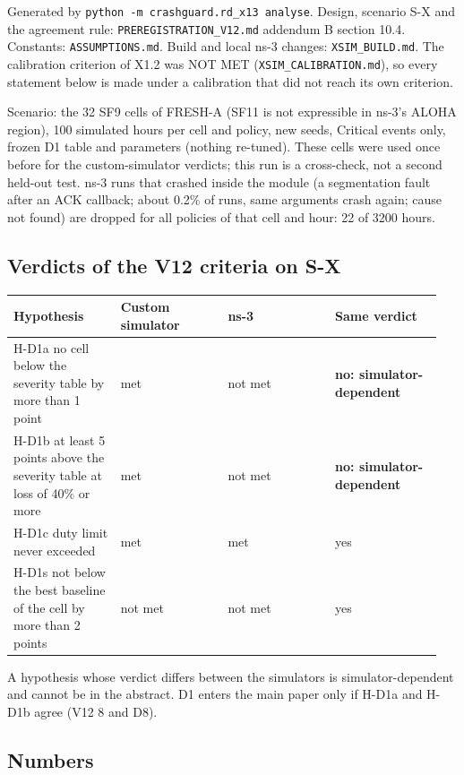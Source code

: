 


Generated by \texttt{python -m crashguard.rd\_x13 analyse}. Design, scenario S-X and the agreement rule: \texttt{PREREGISTRATION\_V12.md} addendum B section 10.4. Constants: \texttt{ASSUMPTIONS.md}. Build and local ns-3 changes: \texttt{XSIM\_BUILD.md}. The calibration criterion of X1.2 was NOT MET (\texttt{XSIM\_CALIBRATION.md}), so every statement below is made under a calibration that did not reach its own criterion.

Scenario: the 32 SF9 cells of FRESH-A (SF11 is not expressible in ns-3's ALOHA region), 100 simulated hours per cell and policy, new seeds, Critical events only, frozen D1 table and parameters (nothing re-tuned). These cells were used once before for the custom-simulator verdicts; this run is a cross-check, not a second held-out test. ns-3 runs that crashed inside the module (a segmentation fault after an ACK callback; about 0.2\% of runs, same arguments crash again; cause not found) are dropped for all policies of that cell and hour: 22 of 3200 hours.

\subsection*{Verdicts of the V12 criteria on S-X}

{\scriptsize\raggedright
\begin{longtable}{p{0.237\linewidth}p{0.237\linewidth}p{0.237\linewidth}p{0.237\linewidth}}
\toprule
Hypothesis & Custom simulator & ns-3 & Same verdict \\
\midrule
\endhead
H-D1a no cell below the severity table by more than 1 point & met & not met & \textbf{no: simulator-dependent} \\
H-D1b at least 5 points above the severity table at loss of 40\% or more & met & not met & \textbf{no: simulator-dependent} \\
H-D1c duty limit never exceeded & met & met & yes \\
H-D1s not below the best baseline of the cell by more than 2 points & not met & not met & yes \\
\bottomrule
\end{longtable}}

A hypothesis whose verdict differs between the simulators is simulator-dependent and cannot be in the abstract. D1 enters the main paper only if H-D1a and H-D1b agree (V12 8 and D8).

\subsection*{Numbers}

